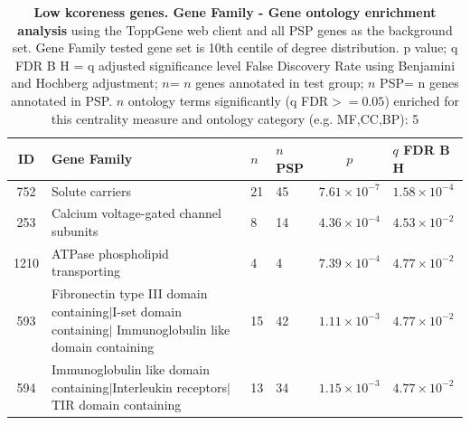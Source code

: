  \begin{table}[ht]
\centering
\begin{adjustbox}{width=\textwidth}
\setlength{\extrarowheight}{2pt}
\begin{tabular}{@{}clllcl@{}}
  \toprule
  ID & Gene Family & $n$ & $n$ PSP & $p$ & $q$ FDR B H \\ 

  \midrule
752 & Solute carriers & 21 & 45 & $7.61 \times 10^{-7}$ & $1.58 \times 10^{-4}$ \\ 
  253 & Calcium voltage-gated channel subunits & 8 & 14 & $4.36 \times 10^{-4}$ & $4.53 \times 10^{-2}$ \\ 
  1210 & ATPase phospholipid transporting & 4 & 4 & $7.39 \times 10^{-4}$ & $4.77 \times 10^{-2}$ \\ 
  593 & \makecell{Fibronectin type III domain containing$|$I-set domain containing$|$\\Immunoglobulin like domain containing} & 15 & 42 & $1.11 \times 10^{-3}$ & $4.77 \times 10^{-2}$ \\ 
  594 & \makecell{Immunoglobulin like domain containing$|$Interleukin receptors$|$\\TIR domain containing} & 13 & 34 & $1.15 \times 10^{-3}$ & $4.77 \times 10^{-2}$ \\ 
   \hline
\end{tabular}
\end{adjustbox}
\caption[Gene ontology enrichment Low kcoreness genes Gene Family of genes above 90th centile of distribution]{\textbf{Low kcoreness genes. Gene Family - Gene ontology enrichment analysis} using the ToppGene web client and all PSP genes as the background set.  Gene Family tested gene set is 10th centile of degree distribution.  p value; q FDR B H = q adjusted significance level False Discovery Rate using Benjamini and Hochberg adjustment; $n$= $n$ genes annotated in test group; $n$ PSP= n genes annotated in PSP. $n$ ontology terms significantly (q FDR$>=0.05$) enriched for this centrality measure and ontology category (e.g. MF,CC,BP): 5} 
\label{tab:ToppGENE Gene Family. kco 10 centile cwpsp.txtp = p value; q FDR B H = q adjusted significance level False Discovery Rate using Benjamini and Hochberg adjustment; n= n genes annotated in test group; n PSP= n genes annotated in PSP. n significant in category 5}
\end{table}

